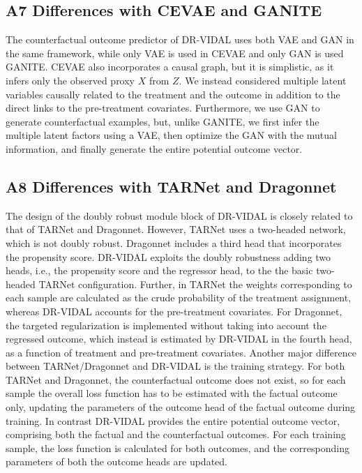 \documentclass{amia}
\begin{document}
\subsection*{A7 Differences with CEVAE and GANITE}
The counterfactual outcome predictor of DR-VIDAL uses both VAE and GAN in the same framework, while only VAE is used in CEVAE and only GAN is used GANITE. CEVAE also incorporates a causal graph, but it is simplistic, as it infers only the observed proxy $X$ from $Z$. We instead considered multiple latent variables causally related to the treatment and the outcome in addition to the direct links to the pre-treatment covariates. Furthermore, we use GAN to generate counterfactual examples, but, unlike GANITE, we first infer the multiple latent factors using a VAE, then optimize the GAN with the mutual information, and finally generate the entire potential outcome vector.

\subsection*{A8 Differences with TARNet and Dragonnet}
The design of the doubly robust module block of DR-VIDAL is closely related to that of TARNet and Dragonnet. However, TARNet uses a two-headed network, which is not doubly robust. Dragonnet includes a third head that incorporates the propensity score. DR-VIDAL exploits the doubly robustness adding two heads, i.e., the propensity score and the regressor head, to the the basic two-headed TARNet configuration. Further, in TARNet the weights corresponding to each sample are calculated as the crude probability of the treatment assignment, whereas DR-VIDAL accounts for the pre-treatment covariates. For Dragonnet, the targeted regularization is implemented without taking into account the regressed outcome, which instead is estimated by DR-VIDAL in the fourth head, as a function of treatment and pre-treatment covariates. Another major difference between TARNet/Dragonnet and DR-VIDAL is the training strategy. For both TARNet and Dragonnet, the counterfactual outcome does not exist, so for each sample the overall loss function has to be estimated with the factual outcome only, updating the parameters of the outcome head of the factual outcome during training. In contrast DR-VIDAL provides the entire potential outcome vector, comprising both the factual and the counterfactual outcomes. For each training sample, the loss function is calculated for both outcomes, and the corresponding parameters of both the outcome heads are updated.
\end{document}
